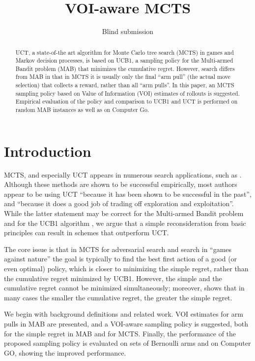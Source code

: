 \documentclass{ecai2012}
\title{VOI-aware MCTS}
\author {Blind submission}
\begin{document}
\maketitle

\begin{abstract}
UCT, a state-of-the art algorithm for Monte Carlo tree search (MCTS)
in games and Markov decision processes, is based on UCB1, a sampling
policy for the Multi-armed Bandit problem (MAB) that 
minimizes the cumulative regret.  However, search differs from MAB in
that in MCTS it is usually only the final ``arm pull'' (the actual
move selection) that collects a reward, rather than all ``arm pulls''.
In this paper, an MCTS sampling policy based on Value of Information
(VOI) estimates of rollouts is suggested. Empirical evaluation of the
policy and comparison to UCB1 and UCT is performed on random MAB instances
as well as on Computer Go.
\end{abstract}

\section{Introduction}

MCTS, and especially UCT \cite{Kocsis.uct} appears in numerous search
applications, such as \cite{Eyerich.ctp}. Although these methods are
shown to be successful empirically, most authors appear to be using
UCT ``because it has been shown to be successful in the past'', and
``because it does a good job of trading off exploration and
exploitation''. While the latter statement may be correct for the
Multi-armed Bandit problem and for the UCB1 algorithm \cite{Auer.ucb},
we argue that a simple reconsideration from basic principles can
result in schemes that outperform UCT.

The core issue is that in MCTS for adversarial search and search in
``games against nature'' the goal is typically to find the best
first action of a good (or even optimal) policy, which is closer to
minimizing the simple regret, rather than the cumulative regret
minimized by UCB1.  However, the simple and the cumulative regret
cannot be minimized simultaneously; moreover, \cite{Bubeck.pure} shows
that in many cases the smaller the cumulative regret, the greater the
simple regret.

We begin with background definitions and related work.  VOI estimates
for arm pulls in MAB are presented, and a VOI-aware sampling policy is
suggested, both for the simple regret in MAB and for MCTS.  Finally,
the performance of the proposed sampling policy is evaluated on sets
of Bernoulli arms and on Computer GO, showing the improved
performance.
\end{document}
